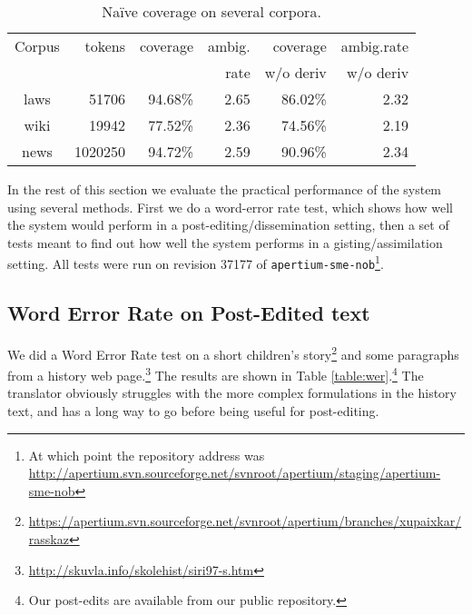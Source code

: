 \documentclass{book}
\begin{document}
\begin{table}
  \begin{center}
  \begin{tabular}{crrrrr}
   Corpus     & tokens   & coverage & ambig.      & coverage   & ambig.rate  \\
              &          &          & rate        & w/o deriv  & w/o deriv \\
   laws       &  51706   & 94.68\%  & 2.65        & 86.02\%    & 2.32 \\
   wiki       & 19942    & 77.52\%  & 2.36        & 74.56\%    & 2.19 \\
   news       & 1020250  & 94.72\%  & 2.59        & 90.96\%    & 2.34 \\
  \end{tabular}
    \caption{Na\"{i}ve coverage on several corpora.}
    \label{table:cov}
  \end{center}
\end{table}
In the rest of this section we evaluate the practical performance of
the system using several methods. First we do a word-error rate test,
which shows how well the system would perform in a
post-editing/dissemination setting, then a set of tests meant to find
out how well the system performs in a gisting/assimilation setting.
All tests were run on revision 37177 of \texttt{apertium-sme-nob}\footnote{At which point the repository address was\\
  \href{http://apertium.svn.sourceforge.net/svnroot/apertium/staging/apertium-sme-nob}{http://apertium.svn.sourceforge.net/svnroot/apertium/staging/apertium-sme-nob}}.



\subsection{Word Error Rate on Post-Edited text}
\label{sec:WER}
We did a Word Error Rate test on a short children's
story\footnote{\href{https://apertium.svn.sourceforge.net/svnroot/apertium/branches/xupaixkar/rasskaz}{https://apertium.svn.sourceforge.net/svnroot/apertium/branches/xupaixkar/rasskaz}}
and some paragraphs from a history web
page.\footnote{\href{http://skuvla.info/skolehist/siri97-s.htm}{http://skuvla.info/skolehist/siri97-s.htm}}
The results are shown in Table \ref{table:wer}.\footnote{Our post-edits
  are available from our public repository.} The translator obviously
struggles with the more complex formulations in the history text, and
has a long way to go before being useful for post-editing.
\end{document}
